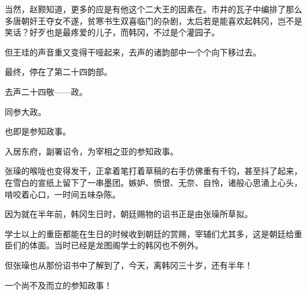 当然，赵颢知道，更多的应是有他这个二大王的因素在。市井的瓦子中编排了那么多唐朝奸王夺女不遂，贫寒书生双喜临门的杂剧，太后若是能喜欢起韩冈，岂不是笑话？好歹也是最疼爱的儿子，而韩冈，不过是个灌园子。

但王珪的声音重又变得干哑起来，去声的诸韵部中一个个向下移过去。

最终，停在了第二十四韵部。

去声二十四敬——政。

同参大政。

也即是参知政事。

入居东府，副署诏令，为宰相之亚的参知政事。

张璪的喉咙也变得发干，正拿着笔打着草稿的右手仿佛重有千钧，甚至抖了起来，在雪白的宣纸上留下了一串墨团。嫉妒、愤恨、无奈、自怜，诸般心思涌上心头，啃咬着心口，一时间五味杂陈。

因为就在半年前，韩冈生日时，朝廷赐物的诏书正是由张璪所草拟。

学士以上的重臣都能在生日的时候收到朝廷的赏赐，宰辅们尤其多，这是朝廷给重臣们的体面。当时已经是龙图阁学士的韩冈也不例外。

但张璪也从那份诏书中了解到了，今天，离韩冈三十岁，还有半年！

一个尚不及而立的参知政事！
